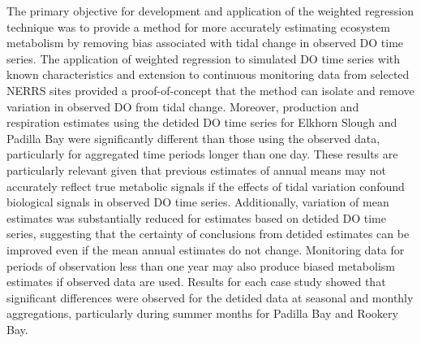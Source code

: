 The primary objective for development and application of the weighted regression technique was to provide a method for more accurately estimating ecosystem metabolism by removing bias associated with tidal change in observed \ac{DO} time series.  The application of weighted regression to simulated \ac{DO} time series with known characteristics and extension to continuous monitoring data from selected \ac{NERRS} sites provided a proof-of-concept that the method can isolate and remove variation in observed \ac{DO} from tidal change.  Moreover, production and respiration estimates using the detided \ac{DO} time series for Elkhorn Slough and Padilla Bay were significantly different than those using the observed data, particularly for aggregated time periods longer than one day. These results are particularly relevant given that previous estimates of annual means may not accurately reflect true metabolic signals if the effects of tidal variation confound biological signals in observed \ac{DO} time series.  Additionally, variation of mean estimates was substantially reduced for estimates based on detided \ac{DO} time series, suggesting that the certainty of conclusions from detided estimates can be improved even if the mean annual estimates do not change.  Monitoring data for periods of observation less than one year may also produce biased metabolism estimates if observed data are used.  Results for each case study showed that significant differences were observed for the detided data at seasonal and monthly aggregations, particularly during summer months for Padilla Bay and Rookery Bay.  

